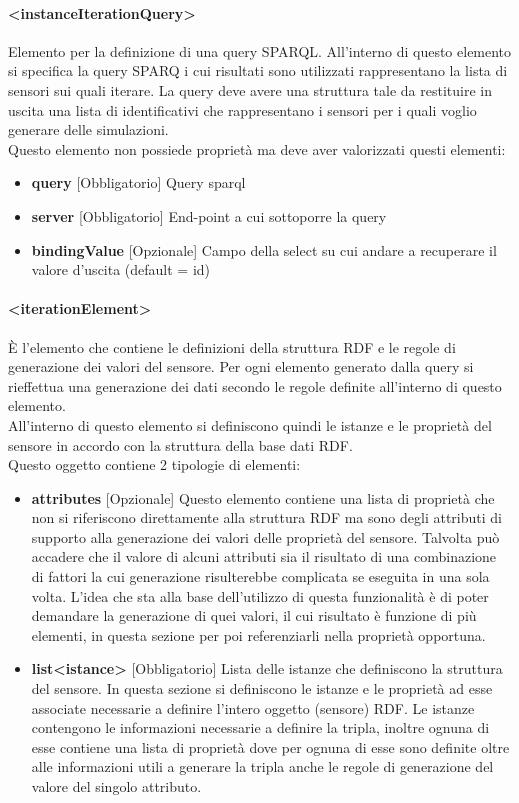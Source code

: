 \documentclass[12pt,a4paper,italian]{article}
\begin{document}
\paragraph{\large{<instanceIterationQuery>}}
Elemento per la definizione di una query SPARQL. All'interno di questo elemento si specifica la query SPARQ i cui risultati sono utilizzati rappresentano la lista di sensori sui quali iterare.
La query deve avere una struttura tale da restituire in uscita una lista di identificativi che rappresentano i sensori per i quali voglio generare delle simulazioni.\\
Questo elemento non possiede proprietà ma deve aver valorizzati questi elementi:
\begin{itemize}
	\item \textbf{query} [Obbligatorio] Query sparql
	\item \textbf{server} [Obbligatorio] End-point a cui sottoporre la query
	\item \textbf{bindingValue} [Opzionale] Campo della select su cui andare a recuperare il valore d'uscita (default = id)
\end{itemize}
\paragraph{\large{<iterationElement>}}
\`E l'elemento che contiene le definizioni della struttura RDF e le regole di generazione dei valori del sensore. Per ogni elemento generato dalla query si
rieffettua una generazione dei dati secondo le regole definite all'interno di questo elemento.\\
All'interno di questo elemento si definiscono quindi le istanze e le proprietà del sensore in accordo con la struttura della base dati RDF.\\
Questo oggetto contiene 2 tipologie di elementi:
\begin{itemize}
	\item \textbf{attributes} [Opzionale] Questo elemento contiene una lista di proprietà che non si riferiscono direttamente alla struttura RDF ma sono degli attributi 
	di supporto alla generazione dei valori delle proprietà del sensore. Talvolta può accadere che il valore di alcuni attributi sia il risultato di una combinazione di fattori la cui generazione 
	risulterebbe complicata se eseguita in una sola volta. L'idea che sta alla base dell'utilizzo di questa funzionalità è di poter demandare la generazione di quei valori, il cui risultato è funzione di più elementi,
	in questa sezione per poi referenziarli nella proprietà opportuna.
	\item \textbf{list<istance>} [Obbligatorio] Lista delle istanze che definiscono la struttura del sensore. In questa sezione si definiscono le istanze e 
	le proprietà ad esse associate necessarie a definire l'intero oggetto (sensore) RDF. Le istanze contengono le informazioni necessarie a definire la tripla, inoltre ognuna di esse contiene 
	una lista di proprietà dove per ognuna di esse sono definite oltre alle informazioni utili a generare la tripla anche le regole di generazione del valore del singolo attributo.
\end{itemize} 
\end{document}

